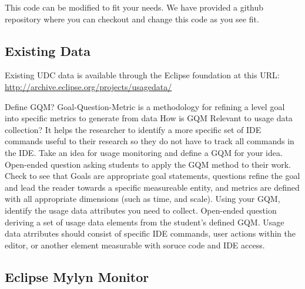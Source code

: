 This code can be modified to fit your needs.
We have provided a github repository where you can checkout 
and change this code as you see fit.

\subsection{Existing Data}

Existing UDC data is available through the Eclipse foundation at this URL:
\url{http://archive.eclipse.org/projects/usagedata/}

\begin{ExerciseList}
 \Exercise[type={long}, difficulty={0}]Define GQM?
  \Answer Goal-Question-Metric is a methodology for refining a level goal into specific metrics to generate from data
 \Exercise[ type={long}, difficulty={1}]How is GQM Relevant to usage data collection?
  \Answer It helps the researcher to identify a more specific set of IDE commands useful to their research so they do not have to track all commands in the IDE.
  \Exercise[ type={long}, difficulty={2}]Take an idea for usage monitoring and define a GQM for your idea.
  \Answer Open-ended question asking students to apply the GQM method to their work.  Check to see that Goals are appropriate goal statements, questions refine the goal and lead the reader towards a specific measureable entity, and metrics are defined with all appropriate dimensions (such as time, and scale).
  \Exercise[ type={long}, difficulty={2}]Using your GQM, identify the usage data attributes you need to collect.
  \Answer Open-ended question deriving a set of usage data elements from the student's defined GQM.  Usage data atrributes should consist of specific IDE commands, user actions within the editor, or another element measurable with soruce code and IDE access.

\end{ExerciseList}


\subsection{Eclipse Mylyn Monitor}
